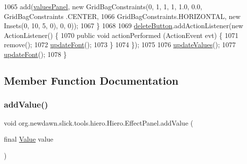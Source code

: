 \begin{DoxyCode}
1065                 add(\mbox{\hyperlink{classorg_1_1newdawn_1_1slick_1_1tools_1_1hiero_1_1_hiero_1_1_effect_panel_af5143573310e9ad4c1d3ff511d8967de}{valuesPanel}}, \textcolor{keyword}{new} GridBagConstraints(0, 1, 1, 1, 1.0, 0.0, GridBagConstraints
      .CENTER,
1066                     GridBagConstraints.HORIZONTAL, \textcolor{keyword}{new} Insets(0, 10, 5, 0), 0, 0));
1067             \}
1068 
1069             \mbox{\hyperlink{classorg_1_1newdawn_1_1slick_1_1tools_1_1hiero_1_1_hiero_1_1_effect_panel_af714c92441bfd930e38dfad0ea00457a}{deleteButton}}.addActionListener(\textcolor{keyword}{new} ActionListener() \{
1070                 \textcolor{keyword}{public} \textcolor{keywordtype}{void} actionPerformed (ActionEvent evt) \{
1071                     \textcolor{keyword}{remove}();
1072                     \mbox{\hyperlink{classorg_1_1newdawn_1_1slick_1_1tools_1_1hiero_1_1_hiero_aaee4b931c33090913c970c8484c90af7}{updateFont}}();
1073                 \}
1074             \});
1075 
1076             \mbox{\hyperlink{classorg_1_1newdawn_1_1slick_1_1tools_1_1hiero_1_1_hiero_1_1_effect_panel_afca6e77363d958d8cfae9344755c2526}{updateValues}}();
1077             \mbox{\hyperlink{classorg_1_1newdawn_1_1slick_1_1tools_1_1hiero_1_1_hiero_aaee4b931c33090913c970c8484c90af7}{updateFont}}();
1078         \}
\end{DoxyCode}


\subsection{Member Function Documentation}
\mbox{\label{classorg_1_1newdawn_1_1slick_1_1tools_1_1hiero_1_1_hiero_1_1_effect_panel_ae531b30644da40b2caa6c2259913359c}} 
\subsubsection{\texorpdfstring{add\+Value()}{addValue()}}
{\footnotesize\ttfamily void org.\+newdawn.\+slick.\+tools.\+hiero.\+Hiero.\+Effect\+Panel.\+add\+Value (\begin{DoxyParamCaption}\item[{final \mbox{\hyperlink{interfaceorg_1_1newdawn_1_1slick_1_1font_1_1effects_1_1_configurable_effect_1_1_value}{Value}}}]{value }\end{DoxyParamCaption})\hspace{0.3cm}{\ttfamily [inline]}}


